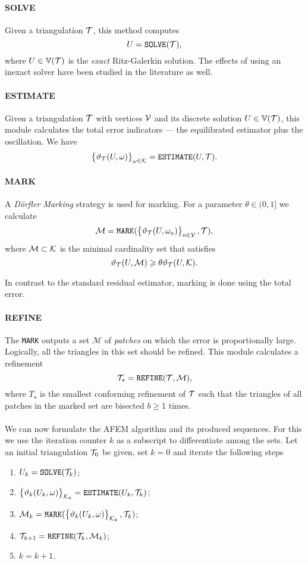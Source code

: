 \documentclass[thesis.tex]{subfiles}
\begin{document}
\paragraph{SOLVE}Given a triangulation $\mathcal{T}$, this method computes
\[
  U = \texttt{SOLVE}(\mathcal{T}),
\]
where $U \in \mathbb{V}(\mathcal{T})$ is the \emph{exact} Ritz-Galerkin solution. The effects of using an inexact solver have
been studied in the literature as well.
\paragraph{ESTIMATE} Given a triangulation $\mathcal{T}$ with vertices $\mathcal{V}$ and its discrete solution $U \in \mathbb{V}(\mathcal{T})$, this module 
calculates the total error indicators --- the equilibrated estimator plus the oscillation. We have
\[
  \set{\vartheta_{\mathcal{T}}(U, \omega)}_{\omega \in \mathcal{K}} = \texttt{ESTIMATE}(U, \mathcal{T}).
\]
\paragraph{MARK}
A \emph{D\"orfler Marking} strategy is used for marking. For a parameter $\theta \in (0,1]$ we calculate
\[
  \mathcal{M} = \texttt{MARK}( \set{\vartheta_{\mathcal{T}}(U, \omega_a)}_{a \in \mathcal{V}}, \mathcal{T}),
\]
where $\mathcal{M} \subset \mathcal{K}$ is the minimal cardinality set that satisfies
\[
  \vartheta_{\mathcal{T}}(U,\mathcal{M}) \geqslant \theta \vartheta_{\mathcal{T}}(U, \mathcal{K}).
\]
\begin{rem}
  In contrast to the standard residual estimator, marking is done using the total error.
\end{rem}
\paragraph{REFINE}
The \texttt{MARK} outputs a set $\mathcal{M}$ of \emph{patches} on which the error is proportionally large. 
Logically, all the triangles in this set should be refined. This module calculates a refinement
\[
  \mathcal{T}_\star = \texttt{REFINE}(\mathcal{T}, \mathcal{M}),
\]
where $T_\star$ is the smallest conforming refinement of $\mathcal{T}$ such that the triangles of
all patches in the marked set are bisected $b \geq 1$ times.
\\\\
We can now formulate the AFEM algorithm and its produced sequences. For this we use the
iteration counter $k$ as a subscript to differentiate among the sets.
Let an initial triangulation $\mathcal{T}_0$ be given, set $k = 0$ and iterate the following steps
\begin{enumerate}
\item $U_k = \texttt{SOLVE}(\mathcal{T}_k)$;
\item $\set{\vartheta_k(U_k, \omega)}_{\mathcal{K}_k} = \texttt{ESTIMATE}(U_k, \mathcal{T}_k)$;
  \item $\mathcal{M}_k = \texttt{MARK}(\set{\vartheta_k(U_k, \omega)}_{\mathcal{K}_k}, \mathcal{T}_k)$;
  \item $\mathcal{T}_{k+1} = \texttt{REFINE}(\mathcal{T}_k, \mathcal{M}_k)$;
  \item $k  = k + 1$.
\end{enumerate}
\end{document}
